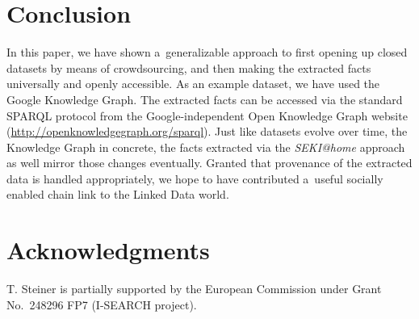 \documentclass[runningheads,a4paper]{llncs}
\begin{document}
\section{Conclusion}
In this paper, we have shown a~generalizable approach
to first opening up closed datasets by means of crowdsourcing,
and then making the extracted facts universally and openly accessible.
As an example dataset, we have used the Google Knowledge Graph.
The extracted facts can be accessed via the standard SPARQL protocol
from the Google-independent Open Knowledge Graph website
(\url{http://openknowledgegraph.org/sparql}).
Just like datasets evolve over time, the Knowledge Graph in concrete,
the facts extracted via the \emph{SEKI@home} approach as well
mirror those changes eventually.
Granted that provenance of the extracted data is handled appropriately,
we hope to have contributed a~useful socially enabled chain link
to the Linked Data world.

\section*{Acknowledgments}
T. Steiner is partially supported by the European Commission
under Grant No.~248296 FP7 (\mbox{I-SEARCH} project).



\end{document}
